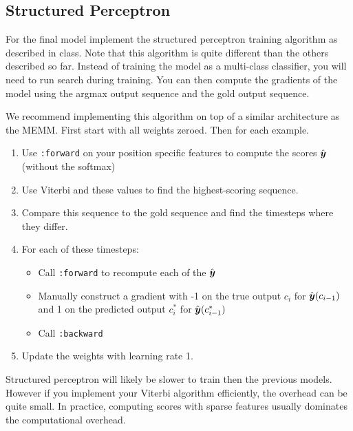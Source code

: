 \documentclass[11pt]{article}
\begin{document}


\subsection{Structured Perceptron}

For the final model implement the structured perceptron training algorithm as 
described in class. Note that this algorithm is quite different than 
the others described so far. Instead of training the model as a multi-class
classifier, you will need to run search during training. You can then compute 
the gradients of the model using the argmax output sequence and the gold output 
sequence. 

We recommend implementing this algorithm on top of a similar architecture 
as the MEMM. First start with all weights zeroed. Then for each example.

\begin{enumerate}
\item Use \texttt{:forward} on your position specific features to compute the scores $\hat{\boldsymbol{y}}$ (without the softmax)
\item Use Viterbi and these values to find the highest-scoring sequence.
\item Compare this sequence to the gold sequence and find the timesteps where they differ.
\item For each of these timesteps: 
  \begin{itemize}
  \item Call \texttt{:forward} to recompute each of the $\hat{\boldsymbol{y}}$ 
  \item Manually construct a gradient with -1 on the true output $c_i$  for $\hat{\boldsymbol{y}}(c_{i-1})$ and 1 on the predicted output $c^*_i$ for $\hat{\boldsymbol{y}}(c^*_{i-1})$
  \item Call \texttt{:backward}
  \end{itemize}
\item Update the weights with learning rate 1.
\end{enumerate}

Structured perceptron will likely be slower to train then the previous
models. However if you implement your Viterbi algorithm efficiently,
the overhead can be quite small. In practice, computing scores with
sparse features usually dominates the computational overhead. 
\end{document}
